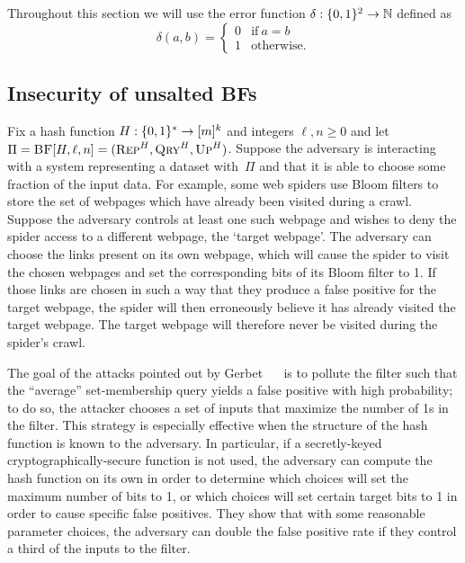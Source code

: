 %
Throughout this section we will use the error function $\delta:\{0,1\}^2\to\mathbb{N}$
defined as
\begin{equation*}
  \delta(a, b) =
  \begin{cases}
    0 & \text{if}\ a=b \\
    1 & \text{otherwise.}
  \end{cases}
\end{equation*}

\subsection{Insecurity of unsalted BFs}
Fix a hash function $H:\{0,1\}^*\to[m]^k$ and integers $\ell,n\geq0$ and let $\Pi
= \textnormal{\textsc{BF}}[H,\ell,n] = (\textnormal{\textsc{Rep}}^H, \textnormal{\textsc{Qry}}^H, \textnormal{\textsc{Up}}^H)$.
%
Suppose the adversary is interacting with a system representing a dataset
with~$\Pi$ and that it is able to choose some fraction of the input data.
For example, some web spiders use Bloom filters to store the set of webpages
which have already been visited during a crawl. Suppose the adversary controls
at least one such webpage and wishes to deny the spider access to a different
webpage, the `target webpage'. The adversary can choose the links present on its
own webpage, which will cause the spider to visit the chosen webpages and set
the corresponding bits of its Bloom filter to 1. If those links are chosen in
such a way that they produce a false positive for the target webpage, the spider
will then erroneously believe it has already visited the target webpage. The
target webpage will therefore never be visited during the spider's crawl.

%
The goal of the attacks pointed out by Gerbet \etal~~\cite{gerbet2015power} is
to pollute the filter such that the ``average'' set-membership query yields a
false positive with high probability; to do so, the attacker chooses a set of
inputs that maximize the number of 1s in the filter. This strategy is especially
effective when the structure of the hash function is known to the adversary. In
particular, if a secretly-keyed cryptographically-secure function is not used,
the adversary can compute the hash function on its own in order to determine
which choices will set the maximum number of bits to 1, or which choices will
set certain target bits to 1 in order to cause specific false positives. They
show that with some reasonable parameter choices, the adversary can double the
false positive rate if they control a third of the inputs to the filter.
%

